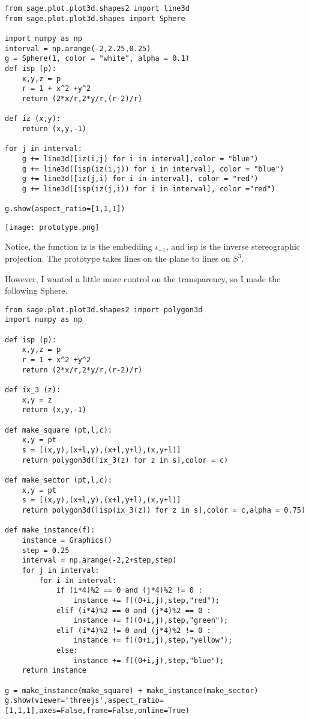 \documentclass{article}
\begin{document}
\begin{verbatim}
from sage.plot.plot3d.shapes2 import line3d
from sage.plot.plot3d.shapes import Sphere

import numpy as np
interval = np.arange(-2,2.25,0.25)
g = Sphere(1, color = "white", alpha = 0.1)
def isp (p):
    x,y,z = p
    r = 1 + x^2 +y^2
    return (2*x/r,2*y/r,(r-2)/r)

def iz (x,y):
    return (x,y,-1)

for j in interval:
    g += line3d([iz(i,j) for i in interval],color = "blue")
    g += line3d([isp(iz(i,j)) for i in interval], color = "blue")
    g += line3d([iz(j,i) for i in interval], color = "red")
    g += line3d([isp(iz(j,i)) for i in interval], color ="red")

g.show(aspect_ratio=[1,1,1])
\end{verbatim}
\begin{center}
  \texttt{[image: prototype.png]}
  \end{center}

Notice, the function iz is the embedding $\iota_{-1}$, and isp is the
inverse stereographic projection. The prototype takes lines on the
plane to lines on $S^3$.

However, I wanted a little more control on the transparency, so I made
the following Sphere.

\begin{verbatim}
from sage.plot.plot3d.shapes2 import polygon3d
import numpy as np

def isp (p):
    x,y,z = p
    r = 1 + x^2 +y^2
    return (2*x/r,2*y/r,(r-2)/r)

def ix_3 (z):
    x,y = z
    return (x,y,-1)

def make_square (pt,l,c):
    x,y = pt
    s = [(x,y),(x+l,y),(x+l,y+l),(x,y+l)]
    return polygon3d([ix_3(z) for z in s],color = c)

def make_sector (pt,l,c):
    x,y = pt
    s = [(x,y),(x+l,y),(x+l,y+l),(x,y+l)]
    return polygon3d([isp(ix_3(z)) for z in s],color = c,alpha = 0.75)

def make_instance(f):
    instance = Graphics()
    step = 0.25
    interval = np.arange(-2,2+step,step)
    for j in interval:
        for i in interval:
            if (i*4)%2 == 0 and (j*4)%2 != 0 :
                instance += f((0+i,j),step,"red");
            elif (i*4)%2 == 0 and (j*4)%2 == 0 :
                instance += f((0+i,j),step,"green");
            elif (i*4)%2 != 0 and (j*4)%2 != 0 :
                instance += f((0+i,j),step,"yellow");
            else:
                instance += f((0+i,j),step,"blue");
    return instance

g = make_instance(make_square) + make_instance(make_sector)
g.show(viewer='threejs',aspect_ratio=[1,1,1],axes=False,frame=False,online=True)
\end{verbatim}
\end{document}
